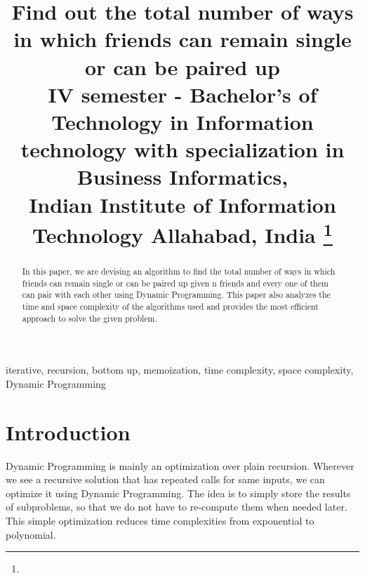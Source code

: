 \documentclass[conference]{IEEEtran}
\begin{document}
\title{Find out the total number of ways in which friends can remain single or can be paired up
\\
{\footnotesize {
IV semester - Bachelor’s of Technology in Information technology with specialization in Business Informatics,\\
Indian Institute of Information Technology Allahabad, India
}}
\thanks{}
}

\author{
\and
{}
\and
{}
}


\maketitle

\begin{abstract}
In this paper, we are devising an algorithm to find the total number of ways in which friends can remain single or can be paired up given n friends and every one of them can pair with each other using Dynamic Programming. This paper also analyzes the time and space complexity of the algorithms used and provides the most efficient approach to solve the given problem.
\end{abstract}
\bigskip
\begin{IEEEkeywords}
iterative, recursion, bottom up, memoization, time complexity, space complexity, Dynamic Programming
\end{IEEEkeywords}

\section{Introduction}
Dynamic Programming is mainly an optimization over plain recursion. Wherever we see a recursive solution that has repeated calls for same inputs, we can optimize it using Dynamic Programming. The idea is to simply store the results of subproblems, so that we do not have to re-compute them when needed later. This simple optimization reduces time complexities from exponential to polynomial.
\end{document}
